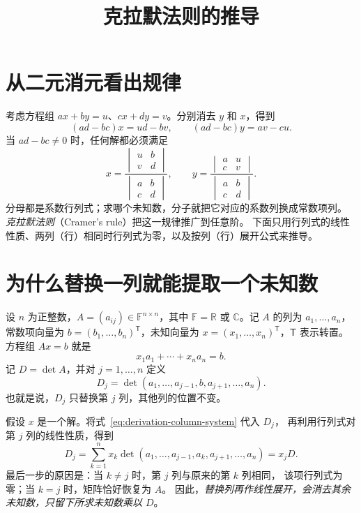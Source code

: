 \documentclass[UTF8,12pt,a4paper,fontset=fandol]{ctexart}
\title{克拉默法则的推导}
\author{}
\date{}
\begin{document}
\maketitle

\section{从二元消元看出规律}

考虑方程组 $ax+by=u$、$cx+dy=v$。分别消去 $y$ 和 $x$，得到
\[
  (ad-bc)x=ud-bv,\qquad (ad-bc)y=av-cu.
\]
当 $ad-bc\ne0$ 时，任何解都必须满足
\[
  x=\frac{\begin{vmatrix}u&b\\v&d\end{vmatrix}}
          {\begin{vmatrix}a&b\\c&d\end{vmatrix}},\qquad
  y=\frac{\begin{vmatrix}a&u\\c&v\end{vmatrix}}
          {\begin{vmatrix}a&b\\c&d\end{vmatrix}}.
\]
分母都是系数行列式；求哪个未知数，分子就把它对应的系数列换成常数项列。
\emph{克拉默法则}（Cramer's rule）把这一规律推广到任意阶。
下面只用行列式的线性性质、两列（行）相同时行列式为零，以及按列（行）展开公式来推导。

\section{为什么替换一列就能提取一个未知数}

设 $n$ 为正整数，$A=(a_{ij})\in\mathbb F^{n\times n}$，其中
$\mathbb F=\mathbb R$ 或 $\mathbb C$。记 $A$ 的列为 $a_1,\ldots,a_n$，
常数项向量为 $b=(b_1,\ldots,b_n)^{\mathsf T}$，未知向量为
$x=(x_1,\ldots,x_n)^{\mathsf T}$，$\mathsf T$ 表示转置。
方程组 $Ax=b$ 就是
\begin{equation}
  x_1a_1+\cdots+x_na_n=b.
  \label{eq:derivation-column-system}
\end{equation}
记 $D=\det A$，并对 $j=1,\ldots,n$ 定义
\[
  D_j=\det(a_1,\ldots,a_{j-1},b,a_{j+1},\ldots,a_n).
\]
也就是说，$D_j$ 只替换第 $j$ 列，其他列的位置不变。

假设 $x$ 是一个解。将式~\eqref{eq:derivation-column-system} 代入 $D_j$，
再利用行列式对第 $j$ 列的线性性质，得到
\begin{equation}
  D_j=\sum_{k=1}^n x_k
  \det(a_1,\ldots,a_{j-1},a_k,a_{j+1},\ldots,a_n)=x_jD.
  \label{eq:derivation-extract}
\end{equation}
最后一步的原因是：当 $k\ne j$ 时，第 $j$ 列与原来的第 $k$ 列相同，
该项行列式为零；当 $k=j$ 时，矩阵恰好恢复为 $A$。
因此，\emph{替换列再作线性展开，会消去其余未知数，只留下所求未知数乘以 $D$}。
\end{document}

